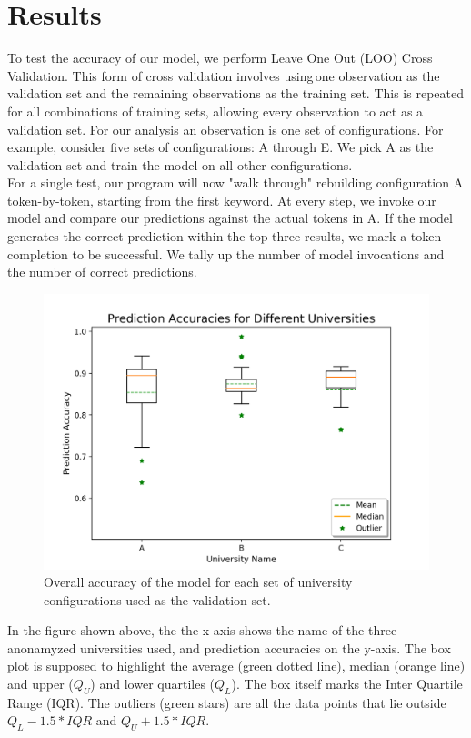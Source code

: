 \section{Results}

To test the accuracy of our model, we perform Leave One Out (LOO) Cross Validation. This form of cross validation involves using one observation as the validation set and the remaining observations as the training set. This is repeated for all combinations of training sets, allowing every observation to act as a validation set. For our analysis an observation is one set of configurations. For example, consider five sets of configurations: A through E. We pick A as the validation set and train the model on all other configurations.\\

For a single test, our program will now "walk through" rebuilding configuration A token-by-token, starting from the first keyword. At every step, we invoke our model and compare our predictions against the actual tokens in A. If the model generates the correct prediction within the top three results, we mark a token completion to be successful. We tally up the number of model invocations and the number of correct predictions.\\
 
\begin{figure}[H]
	\centering
	\includegraphics[width=5in]{uni_analysis.png}
	\caption{Overall accuracy of the model for each set of university configurations used as the validation set.}
\end{figure}

In the figure shown above, the the x-axis shows the name of the three anonamyzed universities used, and prediction accuracies on the y-axis. The box plot is supposed to highlight the average (green dotted line), median (orange line) and upper ($Q_U$) and lower quartiles ($Q_L$). The box itself marks the Inter Quartile Range (IQR). The outliers (green stars) are all the data points that lie outside $Q_L - 1.5*IQR$ and $Q_U+1.5*IQR$.\\

